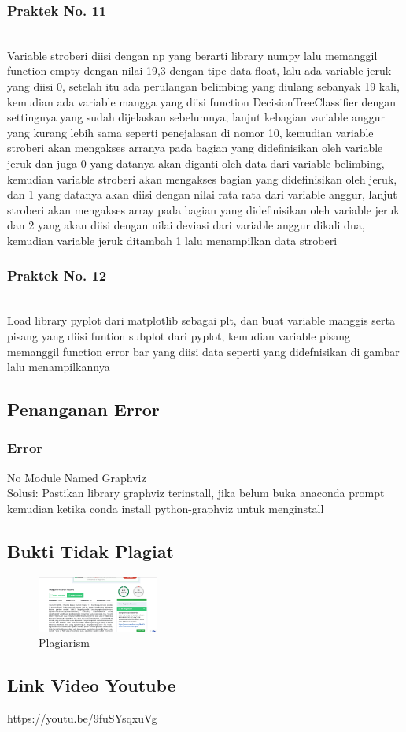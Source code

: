 \subsubsection{Praktek No. 11}
\hfill\\
 
Variable stroberi diisi dengan np yang berarti library numpy lalu memanggil function empty dengan nilai 19,3 dengan tipe data float, lalu ada variable jeruk yang diisi 0, setelah itu ada perulangan belimbing yang diulang sebanyak 19 kali, kemudian ada variable mangga yang diisi function DecisionTreeClassifier dengan settingnya yang sudah dijelaskan sebelumnya, lanjut kebagian variable anggur yang kurang lebih sama seperti penejalasan di nomor 10, kemudian variable stroberi akan mengakses arranya pada bagian yang didefinisikan oleh variable jeruk dan juga 0 yang datanya akan diganti oleh data dari variable belimbing, kemudian variable stroberi akan mengakses bagian yang didefinisikan oleh jeruk, dan 1 yang datanya akan diisi dengan nilai rata rata dari variable anggur, lanjut stroberi akan mengakses array pada bagian yang didefinisikan oleh variable jeruk dan 2 yang akan diisi dengan nilai deviasi dari variable anggur dikali dua, kemudian variable jeruk ditambah 1 lalu menampilkan data stroberi

\subsubsection{Praktek No. 12}
\hfill\\
 
Load library pyplot dari matplotlib sebagai plt, dan buat variable manggis serta pisang yang diisi funtion subplot dari pyplot, kemudian variable pisang memanggil function error bar yang diisi data seperti yang didefnisikan di gambar lalu menampilkannya
\subsection{Penanganan Error}
\subsubsection{Error}
No Module Named Graphviz
\hfill\\

Solusi: 
Pastikan library graphviz terinstall, jika belum buka anaconda prompt kemudian ketika conda install python-graphviz untuk menginstall

\subsection{Bukti Tidak Plagiat}
\begin{figure}[H]
	\includegraphics[width=4cm]{figures/1174079/2/plagiarsm.PNG}
	\centering
	\caption{Plagiarism}
\end{figure}

\subsection{Link Video Youtube}
https://youtu.be/9fuSYsqxuVg	

